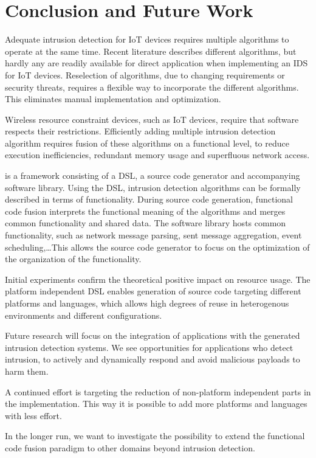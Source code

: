 \documentclass[conference]{IEEEtran}
\begin{document}
\section{Conclusion and Future Work}
\label{conclusion}

Adequate intrusion detection for IoT devices requires multiple algorithms to
operate at the same time. Recent literature describes different algorithms, but
hardly any are readily available for direct application when implementing an
IDS for IoT devices. Reselection of algorithms, due to changing requirements or
security threats, requires a flexible way to incorporate the different
algorithms. This eliminates manual implementation and optimization.

Wireless resource constraint devices, such as IoT devices, require that
software respects their restrictions. Efficiently adding multiple intrusion
detection algorithm requires fusion of these algorithms on a functional level,
to reduce execution inefficiencies, redundant memory usage and superfluous
network access.

\NAME is a framework consisting of a DSL, a source code generator and
accompanying software library. Using the DSL, intrusion detection algorithms
can be formally described in terms of functionality. During source code
generation, functional code fusion interprets the functional meaning of the
algorithms and merges common functionality and shared data. The software
library hosts common functionality, such as network message parsing, sent
message aggregation, event scheduling,\dots This allows the source code
generator to focus on the optimization of the organization of the functionality.

Initial experiments confirm the theoretical positive impact on resource usage.
The platform independent DSL enables generation of source code targeting
different platforms and languages, which allows high degrees of reuse in
heterogenous environments and different configurations.

Future research will focus on the integration of applications with the
generated intrusion detection systems. We see opportunities for applications
who detect intrusion, to actively and dynamically respond and avoid malicious
payloads to harm them.

A continued effort is targeting the reduction of non-platform independent parts
in the implementation. This way it is possible to add more platforms and
languages with less effort.

In the longer run, we want to investigate the possibility to extend the
functional code fusion paradigm to other domains beyond intrusion detection.
\end{document}
